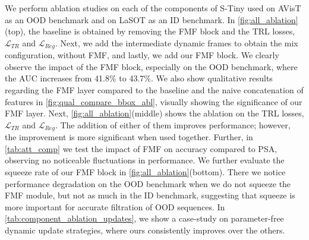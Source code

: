   We perform ablation studies on each of the components of S-Tiny used on AVisT as an OOD benchmark and on LaSOT as an ID benchmark. In \ref{fig:all_ablation}(top), the baseline is obtained by removing the FMF block and the TRL losses, $\mathcal{L}_{TR}$ and $\mathcal{L}_{Reg}$. Next, we add the intermediate dynamic frames to obtain the mix configuration, without FMF, and lastly, we add our FMF block. We clearly observe the impact of the FMF block, especially on the OOD benchmark, where the AUC increases from 41.8\% to 43.7\%. We also show qualitative results regarding the FMF layer compared to the baseline and the naive concatenation of features in \ref{fig:qual_compare_bbox_abl}, visually showing the significance of our FMF layer. 
  Next, \ref{fig:all_ablation}(middle) shows the ablation on the TRL losses, $\mathcal{L}_{TR}$ and $\mathcal{L}_{Reg}$. The addition of either of them improves performance; however, the improvement is more significant when used together.
  Further, in \ref{tab:att_comp} we test the impact of FMF on accuracy compared to PSA\cite{liu2021polarized}, observing no noticeable fluctuations in performance.
  We further evaluate the squeeze rate of our FMF block in \ref{fig:all_ablation}(bottom). There we notice performance degradation on the OOD benchmark when we do not squeeze the FMF module, but not as much in the ID benchmark, suggesting that squeeze is more important for accurate filtration of OOD sequences.
  In \ref{tab:component_ablation_updates}, we show a case-study on parameter-free dynamic update strategies, where ours consistently improves over the others.
  
